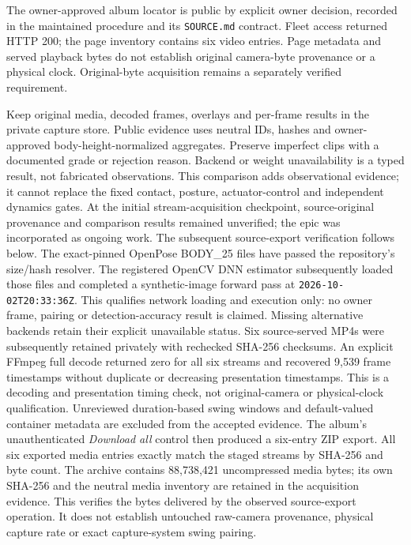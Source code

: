 \documentclass[11pt,a4paper]{article}
\begin{document}
The owner-approved album locator is public by explicit owner decision,
recorded in the maintained procedure and its \texttt{SOURCE.md} contract.
Fleet access returned HTTP 200; the page inventory contains six video
entries. Page metadata and served playback bytes do not establish original
camera-byte provenance or a physical clock. Original-byte acquisition
remains a separately verified requirement.

Keep original media, decoded frames, overlays and per-frame
results in the private capture store. Public evidence uses neutral IDs,
hashes and owner-approved body-height-normalized aggregates. Preserve
imperfect clips with a documented grade or rejection reason. Backend
or weight unavailability is a typed result, not fabricated observations.
This comparison adds observational evidence; it cannot replace the
fixed contact, posture, actuator-control and independent dynamics gates.
At the initial stream-acquisition checkpoint, source-original provenance
and comparison results remained unverified; the epic was incorporated
as ongoing work. The subsequent source-export verification follows below.
The exact-pinned OpenPose BODY\_25 files have passed the repository's
size/hash resolver. The registered OpenCV DNN estimator subsequently
loaded those files and completed a synthetic-image forward pass at
\texttt{2026-10-02T20:33:36Z}. This qualifies network loading and execution
only: no owner frame, pairing or detection-accuracy result is claimed.
Missing alternative backends retain their explicit unavailable status.
Six source-served MP4s were subsequently retained privately with rechecked
SHA-256 checksums. An explicit FFmpeg full decode returned zero for all
six streams and recovered 9,539 frame timestamps without duplicate or
decreasing presentation timestamps. This is a decoding and presentation
timing check, not original-camera or physical-clock qualification.
Unreviewed duration-based swing windows and default-valued container
metadata are excluded from the accepted evidence.
The album's unauthenticated \emph{Download all} control then produced
a six-entry ZIP export. All six exported media entries exactly match
the staged streams by SHA-256 and byte count. The archive contains
88,738,421 uncompressed media bytes; its own SHA-256 and the neutral
media inventory are retained in the acquisition evidence. This verifies
the bytes delivered by the observed source-export operation. It does
not establish untouched raw-camera provenance, physical capture rate
or exact capture-system swing pairing.
\end{document}
